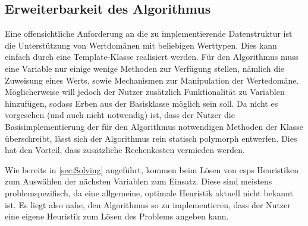 \subsection{Erweiterbarkeit des Algorithmus}
\label{sec:Extensions}
Eine offensichtliche Anforderung an die zu implementierende Datenstruktur  ist die Unterstützung von Wertdomänen mit beliebigen Werttypen. Dies kann einfach durch
eine Template-Klasse realisiert werden. Für den Algorithmus muss eine Variable nur einige wenige Methoden zur Verfügung stellen, nämlich die Zuweisung eines Werts, sowie Mechanismen
zur Manipulation der Wertedomäne. Möglicherweise will jedoch der Nutzer zusätzlich Funktionalität zu Variablen hinzufügen, sodass Erben aus der Basisklasse 
möglich sein soll. Da nicht es vorgesehen (und auch nicht notwendig) ist, dass der Nutzer die Basisimplementierung der für den Algorithmus notwendigen Methoden der Klasse
 überschreibt, lässt sich der Algorithmus rein statisch polymorph entwerfen. Dies hat den Vorteil, dass zusätzliche Rechenkosten vermieden werden.

Wie bereits in \cref{sec:Solving} angeführt, kommen beim Lösen von \acp{csp} Heuristiken zum Auswählen der nächsten Variablen zum Einsatz. Diese sind meistens problemspezifisch,
da eine allgemeine, optimale Heuristik aktuell nicht bekannt ist. Es liegt also nahe, den Algorithmus so zu implementieren, dass der Nutzer eine eigene Heuristik zum Lösen des
Problems angeben kann.
